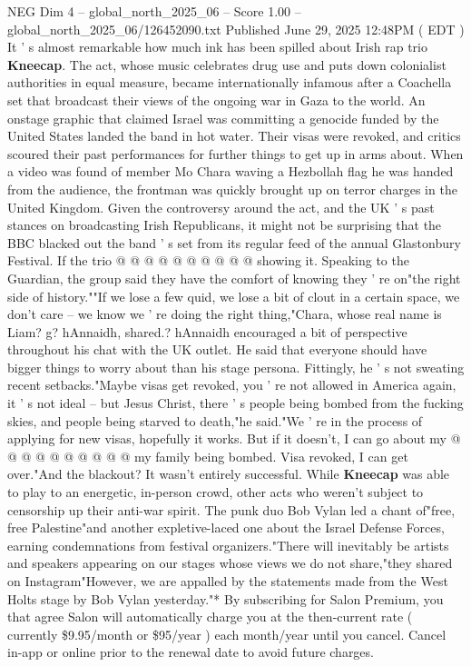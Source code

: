 \begin{textsample}{NEG Dim 4 – global\_north\_2025\_06 – Score 1.00 – global\_north\_2025\_06/126452090.txt}  \label{ex:f4_neg_072}
Published June 29, 2025 12:48PM ( EDT ) It ' s almost remarkable how much ink has been spilled about Irish rap trio \textbf{Kneecap}.
The act, whose music celebrates drug use and puts down colonialist authorities in equal measure, became internationally infamous after a Coachella set that broadcast their views of the ongoing war in Gaza to the world.
An onstage graphic that claimed Israel was committing a genocide funded by the United States landed the band in hot water.
Their visas were revoked, and critics scoured their past performances for further things to get up in arms about.
When a video was found of member Mo Chara waving a Hezbollah flag he was handed from the audience, the frontman was quickly brought up on terror charges in the United Kingdom.
Given the controversy around the act, and the UK ' s past stances on broadcasting Irish Republicans, it might not be surprising that the BBC blacked out the band ' s set from its regular feed of the annual Glastonbury Festival.
If the trio @ @ @ @ @ @ @ @ @ @ showing it.
Speaking to the Guardian, the group said they have the comfort of knowing they ' re on"the right side of history.""If we lose a few quid, we lose a bit of clout in a certain space, we don't care -- we know we ' re doing the right thing,"Chara, whose real name is Liam? g? hAnnaidh, shared.? hAnnaidh encouraged a bit of perspective throughout his chat with the UK outlet.
He said that everyone should have bigger things to worry about than his stage persona.
Fittingly, he ' s not sweating recent setbacks."Maybe visas get revoked, you ' re not allowed in America again, it ' s not ideal -- but Jesus Christ, there ' s people being bombed from the fucking skies, and people being starved to death,"he said."We ' re in the process of applying for new visas, hopefully it works.
But if it doesn't, I can go about my @ @ @ @ @ @ @ @ @ @ my family being bombed.
Visa revoked, I can get over."And the blackout?
It wasn't entirely successful.
While \textbf{Kneecap} was able to play to an energetic, in-person crowd, other acts who weren't subject to censorship up their anti-war spirit.
The punk duo Bob Vylan led a chant of"free, free Palestine"and another expletive-laced one about the Israel Defense Forces, earning condemnations from festival organizers."There will inevitably be artists and speakers appearing on our stages whose views we do not share,"they shared on Instagram"However, we are appalled by the statements made from the West Holts stage by Bob Vylan yesterday."* By subscribing for Salon Premium, you that agree Salon will automatically charge you at the then-current rate ( currently \$9.95/month or \$95/year ) each month/year until you cancel.
Cancel in-app or online prior to the renewal date to avoid future charges.

\end{textsample}
